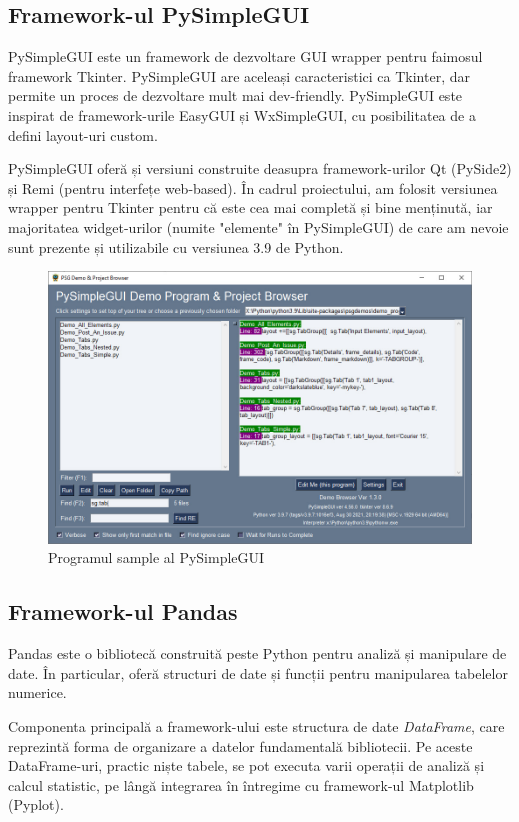 \subsection{Framework-ul PySimpleGUI}

PySimpleGUI este un framework de dezvoltare GUI wrapper pentru faimosul framework Tkinter. PySimpleGUI are aceleași caracteristici ca Tkinter, dar permite un proces de dezvoltare mult mai dev-friendly. PySimpleGUI este inspirat de framework-urile EasyGUI și WxSimpleGUI, cu posibilitatea de a defini layout-uri custom.

PySimpleGUI oferă și versiuni construite deasupra framework-urilor Qt (PySide2) și Remi (pentru interfețe web-based). În cadrul proiectului, am folosit versiunea wrapper pentru Tkinter pentru că este cea mai completă și bine menținută, iar majoritatea widget-urilor (numite "elemente" în PySimpleGUI) de care am nevoie sunt prezente și utilizabile cu versiunea 3.9 de Python.

\begin{figure}[H]
    \centering
    \includegraphics[width=1\textwidth]{continut/capitol2/figuri/PySimpleGUI.jpg}
    \caption{Programul sample al PySimpleGUI}
    \label{fig:PySimpleGUISample}
\end{figure}

\subsection{Framework-ul Pandas}
Pandas este o bibliotecă construită peste Python pentru analiză și manipulare de date. În particular, oferă structuri de date și funcții pentru manipularea tabelelor numerice. 

Componenta principală a framework-ului este structura de date \textit{DataFrame}, care reprezintă forma de organizare a datelor fundamentală bibliotecii. Pe aceste DataFrame-uri, practic niște tabele, se pot executa varii operații de analiză și calcul statistic, pe lângă integrarea în întregime cu framework-ul Matplotlib (Pyplot).

